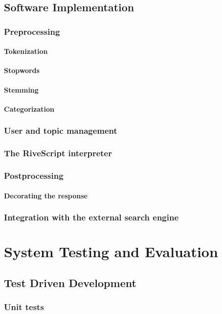 \documentclass[12pt, twoside, a4paper, draft]{report}
\begin{document}
\section{Software Implementation}
\subsection{Preprocessing}
\subsubsection{Tokenization}
\subsubsection{Stopwords}
\subsubsection{Stemming}
\subsubsection{Categorization}
\subsection{User and topic management}
\subsection{The RiveScript interpreter}
\subsection{Postprocessing}
\subsubsection{Decorating the response}
\subsection{Integration with the external search engine}

\chapter{System Testing and Evaluation}
\section{Test Driven Development}
\subsection{Unit tests}
\end{document}
